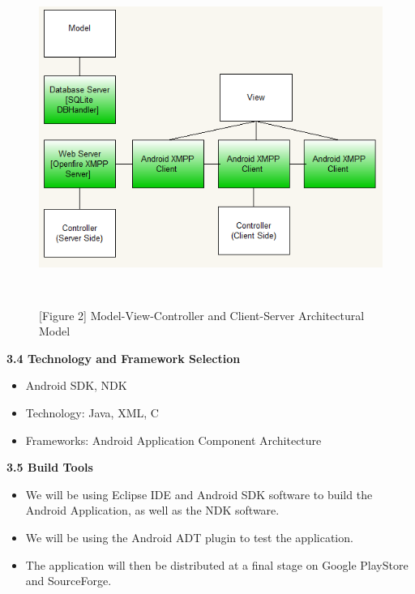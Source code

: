 \documentclass[29pt,a4paper]{moderncv}
\begin{document}
			\noindent\begin{figure}
							\centering
							\includegraphics[width=5.5in, height=4.0in]{./OverallArchitecture.png}
							\\\caption{[Figure 2] Model-View-Controller and Client-Server Architectural Model}
							\end{figure}
			
		\vspace{5mm}
\newpage		
		\noindent \textbf{3.4 Technology and Framework Selection}
			\begin{itemize}
				\item Android SDK, NDK
				\item Technology: Java, XML, C
				\item Frameworks: Android Application Component Architecture
			\end{itemize}
		\vspace{5mm}
		
		\noindent \textbf{3.5 Build Tools}
			\begin{itemize}
				\item We will be using Eclipse IDE and Android SDK software to build the Android Application, as well as the NDK software.
				\item We will be using the Android ADT plugin to test the application. 
				\item The application will then be distributed at a final stage on Google PlayStore and SourceForge.
				
			\end{itemize}
		\vspace{5mm}
	\vspace{5mm}	
\newpage
\end{document}

